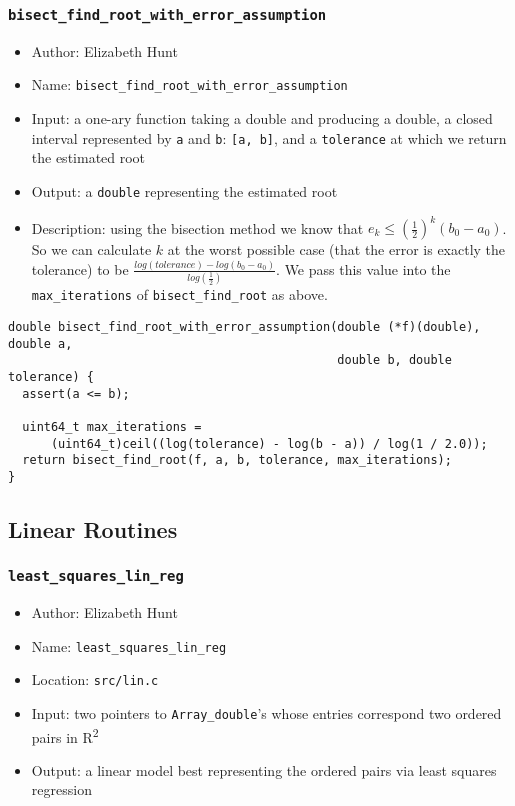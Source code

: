 \documentclass[11pt]{article}
\begin{document}
\subsubsection{\texttt{bisect\_find\_root\_with\_error\_assumption}}
\label{sec:orgeb72b17}
\begin{itemize}
\item Author: Elizabeth Hunt
\item Name: \texttt{bisect\_find\_root\_with\_error\_assumption}
\item Input: a one-ary function taking a double and producing a double, a closed interval represented
by \texttt{a} and \texttt{b}: \texttt{[a, b]}, and a \texttt{tolerance} at which we return the estimated root
\item Output: a \texttt{double} representing the estimated root
\item Description: using the bisection method we know that \(e_k \le (\frac{1}{2})^k (b_0 - a_0)\). So we can
calculate \(k\) at the worst possible case (that the error is exactly the tolerance) to be
\(\frac{log(tolerance) - log(b_0 - a_0)}{log(\frac{1}{2})}\). We pass this value into the \texttt{max\_iterations}
of \texttt{bisect\_find\_root} as above.
\end{itemize}
\begin{verbatim}
double bisect_find_root_with_error_assumption(double (*f)(double), double a,
                                              double b, double tolerance) {
  assert(a <= b);

  uint64_t max_iterations =
      (uint64_t)ceil((log(tolerance) - log(b - a)) / log(1 / 2.0));
  return bisect_find_root(f, a, b, tolerance, max_iterations);
}
\end{verbatim}

\subsection{Linear Routines}
\label{sec:org4e14ee5}
\subsubsection{\texttt{least\_squares\_lin\_reg}}
\label{sec:orge0ed136}
\begin{itemize}
\item Author: Elizabeth Hunt
\item Name: \texttt{least\_squares\_lin\_reg}
\item Location: \texttt{src/lin.c}
\item Input: two pointers to \texttt{Array\_double}'s whose entries correspond two ordered
pairs in R\textsuperscript{2}
\item Output: a linear model best representing the ordered pairs via least squares
regression
\end{itemize}
\end{document}
